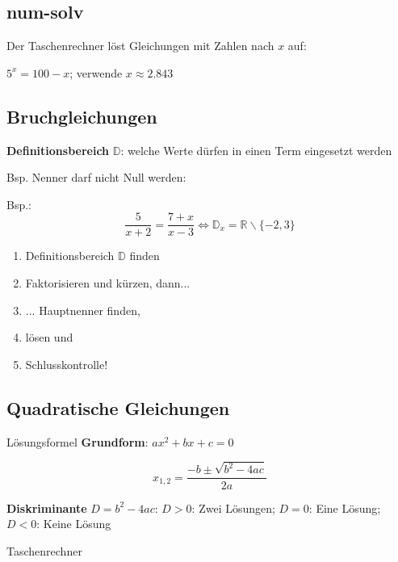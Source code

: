 \begin{multicols}{2}
\subsection*{num-solv}
Der Taschenrechner löst Gleichungen mit Zahlen nach $x$ auf:

$5^x = 100 -x$; verwende  $x\approx{}2.843$



\subsection*{Bruchgleichungen}

\begin{definition*}{}{}

\textbf{Definitionsbereich} $\mathbb{D}$: welche Werte dürfen in einen Term eingesetzt werden

Bsp. Nenner darf nicht Null werden:

Bsp.: $$\frac5{x+2}=\frac{7+x}{x-3} \Leftrightarrow{} \mathbb{D}_x=\mathbb{R}\backslash{}\{-2, 3\}$$
\end{definition*}

\begin{rezept*}{}{}
\begin{enumerate}
\item Definitionsbereich $\mathbb{D}$ finden
\item Faktorisieren und kürzen, dann...
\item ... Hauptnenner finden,
\item lösen und 
\item Schlusskontrolle!
\end{enumerate}
\end{rezept*}


\forceCB
\subsection*{Quadratische Gleichungen}
\begin{gesetz*}{Lösungsformel}{}
\textbf{Grundform}: $ax^2 + bx+c = 0$

$$x_{1,2} = \frac{-b \pm \sqrt{b^2-4ac}}{2a}$$
\end{gesetz*}

\textbf{Diskriminante} $D = b^2-4ac$:
$D>0$: Zwei Lösungen;
$D=0$: Eine Lösung;
$D<0$: Keine Lösung


Taschenrechner \\


\end{multicols}
